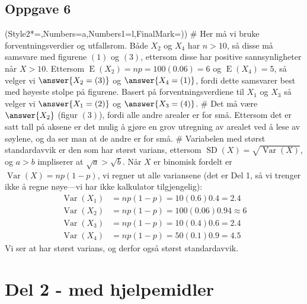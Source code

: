 \subsection*{Oppgave 6}
\begin{easylist}[enumerate]
\ListProperties(Style2*=,Numbers=a,Numbers1=l,FinalMark={)})
# Her må vi bruke forventningsverdier og utfallsrom. Både $X_2$ og $X_4$ har $n > 10$, så disse må samsvare med figurene $(1)$ og $(3)$, ettersom disse har positive sannsynligheter når $X > 10$.
Ettersom $\operatorname{E}(X_2) = np = 100(0.06) = 6$ og $\operatorname{E}(X_4) = 5$, så velger vi $\answer{X_2 = (3)}$ og $\answer{X_4 = (1)}$,
fordi dette samsvarer best med høyeste stolpe på figurene.
Basert på forventningsverdiene til $X_1$ og $X_3$ så velger vi $\answer{X_1 = (2)}$ og $\answer{X_3 = (4)}$.
# Det må være $\answer{X_2}$ (figur $(3)$), fordi alle andre arealer er for små.
Ettersom det er satt tall på aksene er det mulig å gjøre en grov utregning av arealet ved å lese av søylene, og da ser man at de andre er for små.
# Variabelen med størst standardavvik er den som har størst varians, ettersom
$\operatorname{SD}(X) = \sqrt{\operatorname{Var}(X)}$, og $a > b$ impliserer at $\sqrt{a} > \sqrt{b}$.
Når $X$ er binomisk fordelt er $\operatorname{Var}(X) = np(1-p)$, vi regner ut alle variansene (det er Del 1, så vi trenger ikke å regne nøye---vi har ikke kalkulator tilgjengelig):
\begin{align*}
\operatorname{Var}(X_1) &= np(1-p) = 10 (0.6) 0.4 = 2.4 \\ 
\operatorname{Var}(X_2) &= np(1-p) = 100 (0.06) 0.94 \approx 6 \\
\operatorname{Var}(X_3) &= np(1-p) = 10 (0.4) 0.6 = 2.4 \\
\operatorname{Var}(X_4) &= np(1-p) = 50 (0.1) 0.9 = 4.5
\end{align*}
Vi ser at   har størst varians, og derfor også størst standardavvik.
\end{easylist}




\section*{Del 2 - med hjelpemidler}

